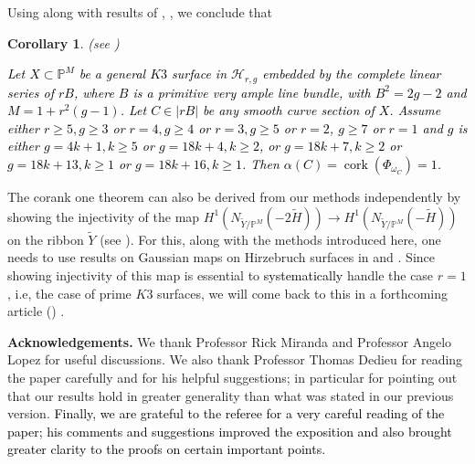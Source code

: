 \documentclass[11pt,twoside]{amsart}
\theoremstyle{plain}
\numberwithin{equation}{section}
\newtheorem{corollary}[theorem]{Corollary}
\theoremstyle{definition}
\begin{document}



\vspace{0.2cm}

\par

Using  along with results of \cite{CDS20}, \cite{ABS17}, we conclude that 
\begin{corollary}\label{corank one intro}(see )

\textcolor{black}{Let $X \subset \mathbb{P}^{M}$ be a general $K3$ surface in $\mathcal{H}_{r,g}$ embedded by the complete linear series of $rB$, where $B$ is a primitive very ample line bundle, with $B^2 = 2g-2$ and $M = 1+r^2(g-1)$. Let $C \in |rB|$ be any smooth curve section of $X$. Assume either $r \geq 5, g \geq 3$ or $r = 4, g \geq 4$ or $r = 3, g \geq 5$ or $r = 2$, $g \geq 7$ or $r = 1$ and $g$ is either $g = 4k+1, k \geq 5$ or $g = 18k+4, k \geq 2$, or $g = 18k+7, k \geq 2$ or $g = 18k+13, k \geq 1$ or $g = 18k+16, k \geq 1$. Then $\alpha(C) = \operatorname{cork}(\Phi_{\omega_C}) = 1$.}
\end{corollary}
The corank one theorem can also be derived from our methods  independently by showing the injectivity of the map $H^1(N_{\widetilde{Y}/\mathbb{P}^M}(-2\widetilde{H})) \to H^1(N_{\widetilde{Y}/\mathbb{P}^M}(-\widetilde{H}))$ on the ribbon $\widetilde{Y}$ (see  ). For this, along with the methods introduced here, one needs to use results on Gaussian maps on Hirzebruch surfaces in \cite{DM92} and \cite{DP12}. Since showing injectivity of this map is essential to \textcolor{black}{systematically} handle the case $r = 1$, i.e, the case of prime $K3$ surfaces, we will come back to this in a forthcoming article (\cite{BM25}) . 

\vspace{0.2cm}

\noindent\textbf{Acknowledgements.} We thank Professor Rick Miranda and Professor Angelo Lopez for useful discussions. We also thank Professor Thomas Dedieu for reading the paper carefully and for his helpful suggestions; in particular for pointing out that our results hold in greater generality than what was stated in our previous version. \textcolor{black}{Finally, we are grateful to the referee for a very careful reading of the paper; his comments and suggestions improved the exposition and also brought greater clarity to the proofs on certain important points.}
\end{document}
